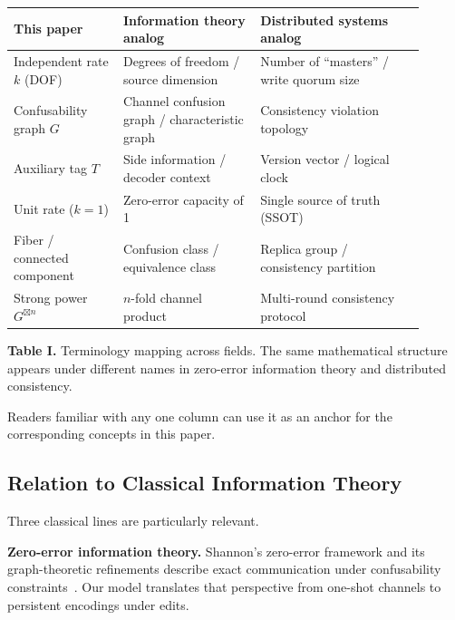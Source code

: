 \begingroup
\small
\setlength{\tabcolsep}{3pt}
\renewcommand{\arraystretch}{1.15}
\begin{center}
\begin{tabularx}{0.98\linewidth}{@{}>{\RaggedRight\arraybackslash}p{0.24\linewidth}>{\RaggedRight\arraybackslash}p{0.30\linewidth}>{\RaggedRight\arraybackslash}p{0.36\linewidth}@{}}
\toprule
\textbf{This paper} & \textbf{Information theory analog} & \textbf{Distributed systems analog} \\
\midrule
Independent rate $k$ (DOF) & Degrees of freedom / source dimension & Number of ``masters'' / write quorum size \\
Confusability graph $G$ & Channel confusion graph / characteristic graph & Consistency violation topology \\
Auxiliary tag $T$ & Side information / decoder context & Version vector / logical clock \\
Unit rate ($k=1$) & Zero-error capacity of 1 & Single source of truth (SSOT) \\
Fiber / connected component & Confusion class / equivalence class & Replica group / consistency partition \\
Strong power $G^{\boxtimes n}$ & $n$-fold channel product & Multi-round consistency protocol \\
\bottomrule
\end{tabularx}
\end{center}
\par\smallskip
\textbf{Table I.} Terminology mapping across fields. The same mathematical structure appears under different names in zero-error information theory and distributed consistency.
\label{tab:terminology}
\par\medskip
\endgroup

Readers familiar with any one column can use it as an anchor for the corresponding concepts in this paper.

\subsection{Relation to Classical Information Theory}\label{sec:connection-it}

Three classical lines are particularly relevant.

\textbf{Zero-error information theory.} Shannon's zero-error framework and its graph-theoretic refinements describe exact communication under confusability constraints~\cite{shannon1956zero,korner1973graphs,lovasz1979shannon}. Our model translates that perspective from one-shot channels to persistent encodings under edits.

